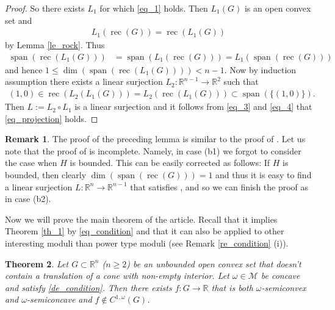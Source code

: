 \documentclass[10pt,a4paper]{amsart}
\newtheorem{theorem}{Theorem}[section]
\theoremstyle{definition}
\newtheorem{remark}[theorem]{Remark}
\newcommand{\R}{\mathbb{R}}
\newcommand{\M}{\mathcal{M}}
\newcommand{\rec}{\operatorname{rec}}
\newcommand{\spann}{\operatorname{span}}
\begin{document}
\begin{proof}
So there exists $ L_1 $ for which \eqref{eq_1} holds. Then $ L_1(G) $ is an open convex set and
\begin{align}\label{eq_3}
L_1(\rec(G))=\rec(L_1(G))
\end{align}
by Lemma \ref{le_rock}. Thus 
\begin{align*}
\spann(\rec(L_1(G)))&=\spann(L_1(\rec(G)))=L_1(\spann(\rec(G)))
\end{align*}
and hence $ 1\leq\dim(\spann(\rec(L_1(G))))<n-1 $. Now by induction assumption there exists a linear surjection $ L_2:\R^{n-1}\to\R^2 $ such that
\begin{align}\label{eq_4}
(1,0)\in\rec(L_2(L_1(G)))=L_2(\rec(L_1(G)))\subset\spann(\lbrace (1,0)\rbrace).
\end{align}
Then $ L:=L_2\circ L_1 $ is a linear surjection and it follows from \eqref{eq_3} and \eqref{eq_4} that \eqref{eq_projection} holds. 
\end{proof}


\begin{remark}
The proof of the preceding lemma is similar to the proof of \cite[Proposition 5.13]{KZ}. Let us note that the proof of \cite[Proposition 5.13]{KZ} is incomplete. Namely, in case (b1) we forgot to consider the case when $ H $ is bounded. This can be easily corrected as follows: If $ H $ is bounded, then clearly $ \dim(\spann(\rec(G)))=1 $ and thus it is easy to find a linear surjection $ L:\R^n\to\R^{n-1} $ that satisfies \cite[(24) and (25)]{KZ}, and so we can finish the proof as in case (b2).
\end{remark}

Now we will prove the main theorem of the article. Recall that it implies Theorem \ref{th_1} by \eqref{eq_condition} and that it can also be applied to other interesting moduli than power type moduli (see Remark \ref{re_condition} (i)).

\begin{theorem}\label{th_main}
Let $ G\subset\R^n $ ($ n\geq 2 $) be an unbounded open convex set that doesn't contain a translation of a cone with non-empty interior. Let $ \omega\in\M $ be concave and satisfy \eqref{de_condition}. Then there exists $ f:G\to\R $ that is both $ \omega $-semiconvex and $ \omega $-semiconcave and $ f\notin C^{1,\omega}(G) $.
\end{theorem}
\end{document}
